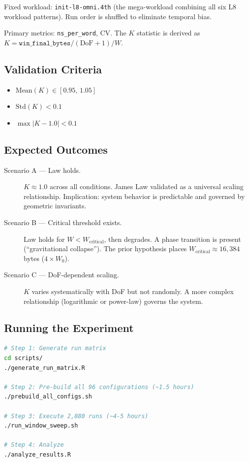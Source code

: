 Fixed workload: \texttt{init-l8-omni.4th} (the mega-workload combining all
six L8 workload patterns). Run order is shuffled to eliminate temporal bias.

Primary metrics: \texttt{ns\_per\_word}, CV. The $K$ statistic is derived
as $K = \texttt{win\_final\_bytes} / (\mathrm{DoF}+1) / W$.

\subsection{Validation Criteria}

\begin{itemize}
  \item $\mathrm{Mean}(K) \in [0.95,\,1.05]$
  \item $\mathrm{Std}(K) < 0.1$
  \item $\max|K - 1.0| < 0.1$
\end{itemize}

\subsection{Expected Outcomes}

\begin{description}
  \item[Scenario A — Law holds.] $K \approx 1.0$ across all conditions.
        James Law validated as a universal scaling relationship. Implication:
        system behavior is predictable and governed by geometric invariants.

  \item[Scenario B — Critical threshold exists.] Law holds for
        $W < W_\text{critical}$, then degrades. A phase transition is
        present (``gravitational collapse''). The prior hypothesis places
        $W_\text{critical} \approx 16{,}384$ bytes ($4 \times W_0$).

  \item[Scenario C — DoF-dependent scaling.] $K$ varies systematically with
        DoF but not randomly. A more complex relationship (logarithmic or
        power-law) governs the system.
\end{description}

\subsection{Running the Experiment}

\begin{lstlisting}[language=bash]
# Step 1: Generate run matrix
cd scripts/
./generate_run_matrix.R

# Step 2: Pre-build all 96 configurations (~1.5 hours)
./prebuild_all_configs.sh

# Step 3: Execute 2,880 runs (~4-5 hours)
./run_window_sweep.sh

# Step 4: Analyze
./analyze_results.R
\end{lstlisting}


